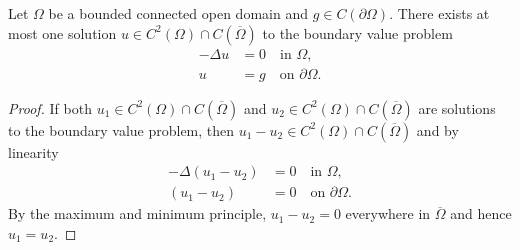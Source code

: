 \begin{theorem}
    Let $\Omega$ be a bounded connected open domain and $g \in C(\partial\Omega)$. There exists at most one solution $u \in C^2(\Omega) \cap C(\overline{\Omega})$ to the boundary value problem
    \begin{align*}
        -\Delta u &= 0 \quad \text{in } \Omega, \\
        u &= g \quad \text{on } \partial\Omega.
    \end{align*}
\end{theorem}
\begin{proof}
    If both $u_1 \in C^2(\Omega) \cap C(\overline{\Omega})$ and $u_2 \in C^2(\Omega) \cap C(\overline{\Omega})$ are solutions to the boundary value problem, then $u_1 - u_2 \in C^2(\Omega) \cap C(\overline{\Omega})$ and by linearity
    \begin{align*}
        -\Delta(u_1 - u_2) &= 0 \quad \text{in } \Omega, \\
        (u_1 - u_2) &= 0 \quad \text{on } \partial\Omega.
    \end{align*}
    By the maximum and minimum principle, $u_1 - u_2 = 0$ everywhere in $\overline{\Omega}$ and hence $u_1 = u_2$.
\end{proof}

